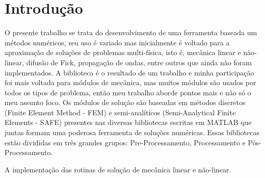 \chapter{Introdução}

O presente trabalho se trata do desenvolvimento de uma ferramenta baseada um métodos numéricos, seu uso é variado mas inicialmente é voltado para a aproximação de soluções de problemas multi-física, isto é, mecânica linear e não-linear, difusão de Fick, propagação de ondas, entre outros que ainda não foram implementados. A biblioteca  é o resultado de um trabalho e minha participação foi mais voltada para módulos de mecânica, mas muitos módulos são usados por todos os tipos de problema, então meu trabalho aborde pontos mais e não só o meu assunto foco.
Os módulos de solução são baseadas em métodos discretos (Finite Element Method - FEM) e semi-analíticos (Semi-Analytical Finite Elements - SAFE) presentes nas diversas bibliotecas escritas em MATLAB que juntas formam uma poderosa ferramenta de soluções numéricas. Essas bibliotecas estão divididas em três grandes grupos: Pre-Processamento, Processamento e Pós-Processamento. 
 
A implementação das rotinas de solução de mecânica linear e não-linear.